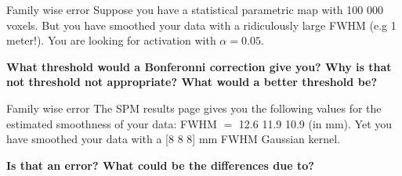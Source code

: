 \documentclass{beamer}
\begin{document}
\begin{frame}{Family wise error}
  Suppose you have a statistical parametric map with 100 000 voxels. \linebreak
  But you have smoothed your data with a ridiculously large FWHM (e.g 1 meter!). You are looking for activation with $\alpha = 0.05$. \linebreak

  \textbf{What threshold would a Bonferonni correction give you? Why is that not threshold not appropriate? What would a better threshold be?}

%
\end{frame}


\begin{frame}{Family wise error}
  The SPM results page gives you the following values for the estimated smoothness of your data: FWHM $=$ 12.6 11.9 10.9 (in mm). Yet you have smoothed your data with a [8 8 8] mm FWHM Gaussian kernel. \linebreak

  \textbf{Is that an error? What could be the differences due to?}

%
\end{frame}
\end{document}
